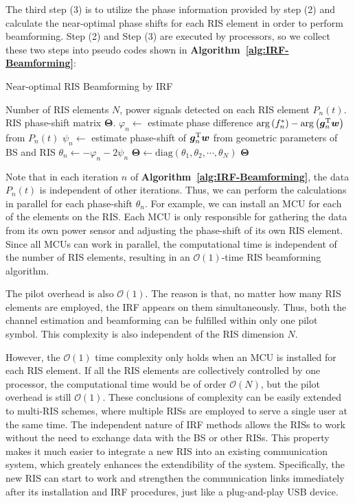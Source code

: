 \documentclass[12pt,draftclsnofoot,journal,onecolumn]{IEEEtran}
\theoremstyle{nonumberplain}
\def \diag {\text{diag}}
\def \arg {\text{arg}}
\begin{document}
    The third step (3) is to utilize the phase information provided by step (2) and calculate the near-optimal phase shifts for each RIS element in order to perform beamforming. 
    Step (2) and Step (3) are executed by processors, so we collect these two steps into pseudo codes shown in {\bf Algorithm~\ref{alg:IRF-Beamforming}}:
    \begin{algorithm}[H] 
        \caption{Near-optimal RIS Beamforming by IRF} \label{alg:IRF-Beamforming}
        \begin{algorithmic}[1]
            \REQUIRE Number of RIS elements $N$, power signals detected on each RIS element $P_n(t)$.
            \ENSURE RIS phase-shift matrix ${\bm \Theta}$.
                \STATE $\varphi_n \leftarrow$ estimate phase difference  $\arg\left(f_{n}^{*}\right)-\arg\left(\bm g_{n}^{\rm T}\bm w\right)$ from $P_n(t)$
                \STATE $\psi_{n} \leftarrow$ estimate phase-shift of $\bm g_{n}^{\rm T}\bm w$ from geometric parameters of BS and RIS
                \STATE $\theta_n \leftarrow -\varphi_n - 2\psi_n$
            \ENDFOR
            \STATE ${\bm \Theta} \leftarrow \diag(\theta_1, \theta_2, \cdots, \theta_N)$
            \RETURN ${\bm \Theta}$
        \end{algorithmic}
    \end{algorithm}
    Note that in each iteration $n$ of {\bf Algorithm~\ref{alg:IRF-Beamforming}}, the data $P_n(t)$ is independent of other iterations. Thus, we can perform the calculations in parallel for each phase-shift $\theta_n$. For example, we can install an MCU for each of the elements on the RIS. Each MCU is only responsible for gathering the data from its own power sensor and adjusting the phase-shift of its own RIS element. Since all MCUs can work in parallel, the computational time is independent of the number of RIS elements, resulting in an $\mathcal{O}(1)$-time RIS beamforming algorithm. 

    The pilot overhead is also $\mathcal{O}(1)$. The reason is that, no matter how many RIS elements are employed, the IRF appears on them simultaneously. Thus, both the channel estimation and beamforming can be fulfilled within only one pilot symbol. This complexity is also independent of the RIS dimension $N$. 

    However, the $\mathcal{O}(1)$ time complexity only holds when an MCU is installed for each RIS element. If all the RIS elements are collectively controlled by one processor, the computational time would be of order $\mathcal{O}(N)$, but the pilot overhead is still $\mathcal{O}(1)$. These conclusions of complexity can be easily extended to multi-RIS schemes, where multiple RISs are employed to serve a single user at the same time. The independent nature of IRF methods allows the RISs to work without the need to exchange data with the BS or other RISs. This property makes it much easier to integrate a new RIS into an existing communication system, which greately enhances the extendibility of the system. Specifically, the new RIS can start to work and strengthen the communication links immediately after its installation and IRF procedures, just like a plug-and-play USB device. 
\end{document}
